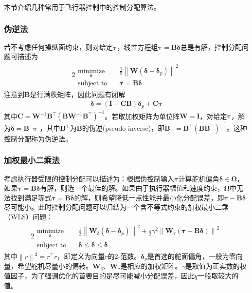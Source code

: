 本节介绍几种常用于飞行器控制中的控制分配算法。
\subsubsection{伪逆法}
%
若不考虑任何操纵面约束，则对给定$ \bm{\tau} $，线性方程组$ \bm{\tau}=\bm{B}\bm{\delta} $总是有解，控制分配问题可描述为
\begin{alignat}{2}
\begin{split}
\mathop {{\text{minimize}}}\limits_{\bm{\delta}}\quad&{\frac{1}{2}\left\|\bm{W}\left(\bm{\delta}-\bm{\delta}_{p}\right)\right\|^{2} } \\
\mbox{subject to}\quad
&\bm{\tau}=\bm{B} \bm{\delta} 
\end{split} \label{inv}
\end{alignat}
注意到$ \bm{B} $是行满秩矩阵，因此问题有闭解\cite{Boyd_2004a}
\begin{align}\bm{\delta}=(\bm{I}-\bm{C B}) \bm{\delta}_{p}+\bm{C \tau}\end{align}
其中$\bm{C}=\bm{W}^{-1} \bm{B}^\top \left(\bm{B} \bm{W}^{-1} \bm{B}^\top \right)^{-1}$。若取加权矩阵为单位阵$ \bm{W}=\bm{I} $，对给定$\bm{\tau }$，解为$ \bm{\delta}=\bm{B}^+ \bm{\tau} $
，其中$\bm{B}^+$为$\bm{B}$的伪逆(pseudo-inverse)，即$ \bm{B}^+= \bm{B}^\top (\bm{B} \bm{B}^\top)^{-1} $。这种控制分配称为伪逆法。

\subsubsection{加权最小二乘法}
考虑执行器受限的控制分配可以描述为\cite{Harkegard_2002}：根据伪控制输入$ \bm{\tau} $计算舵机偏角$\bm{\delta } \in \bm{\Omega} $，如果$ \bm{\tau}=\bm{B}\bm{\delta} $有解，则选一个最佳的解。如果由于执行器幅值和速度约束，$ \bm{\Omega} $中无法找到满足等式$ \bm{\tau}=\bm{B}\bm{\delta} $的解，则希望降低一点性能并最小化分配误差\cite{Harkegard_2002}，即$ \bm{\tau}-\bm{B}\bm{\delta} $尽可能小。此时控制分配问题可以归结为一个含不等式约束的加权最小二乘（WLS）问题：
\begin{alignat}{2}
\begin{split}
\mathop {{\text{minimize}}}\limits_{\bm{\delta}}\quad&{\frac{1}{2}\left\|\bm{W}_{\delta}\left(\bm{\delta}-\bm{\delta}_{p}\right)\right\|^{2}+\frac{1}{2} \gamma^{2}\left\|\bm{W}_{\tau}\left(\bm{\tau}-\bm{B} \bm{\delta}\right)\right\|^{2} } \\
\mbox{subject to}\quad
&\underline{\bm{\delta}} \leq \bm{\delta} \leq \overline{\bm{\delta}}
\end{split} \label{wls}
\end{alignat}
其中$ \left\|r \right\|^{2}=r^\top r $，即定义为向量$ r $的2-范数。$ \bm{\delta}_{p} $是首选的舵面偏角，一般为零向量，希望舵机尽量小的偏转。$ \bm{W}_{\delta} $、$ \bm{W}_{\tau} $是相应的加权矩阵。$ \gamma $是取值为正实数的权值因子，为了强调优化的首要目的是尽可能减小分配误差，因此γ一般取较大的值。

